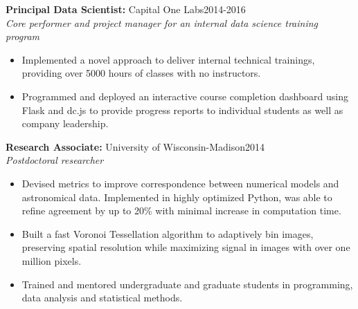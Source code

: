 \documentclass[11pt]{res}
\begin{document}
\begin{resume}
{\bf Principal Data Scientist:} Capital One Labs\hfill\mbox{2014-2016}\\
{\it Core performer and project manager for an internal data science training program}
\vspace*{0.01 in}\begin{itemize} \itemsep -2pt 
  \item Implemented a novel approach to deliver internal technical
    trainings, providing over 5000 hours of classes with no instructors.
  \item Programmed and deployed an interactive course completion dashboard using Flask
    and dc.js to provide progress reports to individual students as
    well as company leadership.
  \end{itemize}

{\bf Research Associate:} University of Wisconsin-Madison\hfill\mbox{2014}\\
{\it Postdoctoral researcher}
                  \vspace* {0.01 in}\begin{itemize} \itemsep -2pt
                    \item Devised metrics to improve correspondence between numerical models and
                      astronomical data. Implemented in highly
                      optimized Python, was able to refine agreement by
                      up to 20\% with minimal increase in computation time.
                    \item Built a fast Voronoi Tessellation algorithm
                      to adaptively bin images, preserving spatial
                      resolution while maximizing signal in images
                      with over one million pixels.
                    \item Trained and mentored undergraduate and
                      graduate students in programming, data analysis and statistical methods.
                    \end{itemize}


\end{resume}
\end{document}
